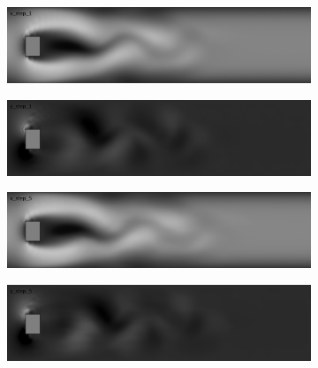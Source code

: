 \documentclass{llncs}
\begin{document}
\begin{figure}[H]
  \begin{subfigure}{.5\textwidth}
    \centering
    \includegraphics[width=1\linewidth]{imgs/sims/fluid/x_step_1}
  \end{subfigure}
  \begin{subfigure}{.5\textwidth}
    \centering
    \includegraphics[width=1\linewidth]{imgs/sims/fluid/y_step_1}
  \end{subfigure}

  \begin{subfigure}{.5\textwidth}
    \centering
    \includegraphics[width=1\linewidth]{imgs/sims/fluid/x_step_5}
  \end{subfigure}
  \begin{subfigure}{.5\textwidth}
    \centering
    \includegraphics[width=1\linewidth]{imgs/sims/fluid/y_step_5}
  \end{subfigure}


\end{figure}
\end{document}
